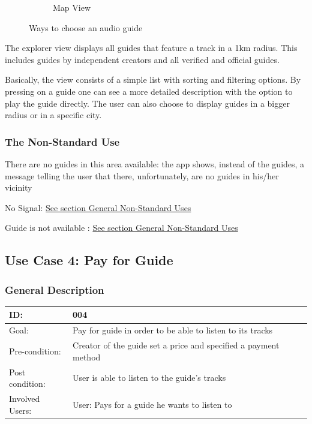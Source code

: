 \documentclass[12pt]{article}
\theoremstyle{definition}
\newenvironment{text}{
   \setlength{\parindent}{0pt}
   \color{black}
}{}
\begin{document}
\begin{figure}[hbt!]
\begin{subfigure}{0.5\textwidth}
            \caption{Map View}
            \label{fig:map_view}
        \end{subfigure}
        \caption{Ways to choose an audio guide}
    \end{figure}
    
    \begin{text}
    The explorer view displays all guides that feature a track in a 1km radius. This includes guides by independent creators and all verified and official guides. 
    
    Basically, the view consists of a simple list with sorting and filtering options. By pressing on a guide one can see a more detailed description with the option to play the guide directly. The user can also choose to display guides in a bigger radius or in a specific city.
    \end{text}
    
    \subsubsection{The Non-Standard Use}
     \begin{text}
    There are no guides in this area available: the app shows, instead of the guides, a message telling the user that there, unfortunately, are no guides in his/her vicinity
    
    No Signal: \hyperref[sec:gnsu]{See section General Non-Standard Uses }
    
    Guide is not available : \hyperref[sec:gnsu]{See section General Non-Standard Uses }
    \end{text}
    
\subsection{Use Case 4: Pay for Guide}
    \subsubsection{General Description}
    
    \begin{tabular}{|p{.2\linewidth}|p{.65\linewidth}|}
        \hline 
        ID: & 004 \\ \hline
        Goal: & Pay for guide in order to be able to listen to its tracks \\ \hline
        Pre-condition: & Creator of the guide  set a price and specified a payment method \\ \hline
        Post condition: & User is able to listen to the guide's tracks \\ \hline
        Involved Users: & User: Pays for a guide he wants to listen to \\ \hline
    \end{tabular}
    
\end{document}
